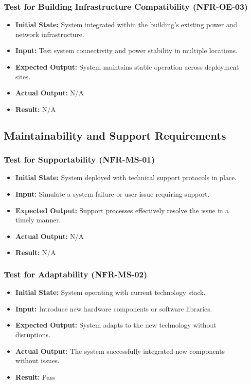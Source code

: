 \documentclass[12pt, titlepage]{article}
\begin{document}
\subsubsection{Test for Building Infrastructure Compatibility (NFR-OE-03)}
\begin{itemize}
    \item \textbf{Initial State: }System integrated within the building's existing power and network infrastructure.
    \item \textbf{Input: }Test system connectivity and power stability in multiple locations.
    \item \textbf{Expected Output: }System maintains stable operation across deployment sites.
    \item \textbf{Actual Output: } N/A
    \item \textbf{Result: }N/A
\end{itemize}

\subsection{Maintainability and Support Requirements}

\subsubsection{Test for Supportability (NFR-MS-01)}
\begin{itemize}
    \item \textbf{Initial State: }System deployed with technical support protocols in place.
    \item \textbf{Input: }Simulate a system failure or user issue requiring support.
    \item \textbf{Expected Output: }Support processes effectively resolve the issue in a timely manner.
    \item \textbf{Actual Output: }N/A
    \item \textbf{Result: }N/A
\end{itemize}

\subsubsection{Test for Adaptability (NFR-MS-02)}
\begin{itemize}
    \item \textbf{Initial State: }System operating with current technology stack.
    \item \textbf{Input: }Introduce new hardware components or software libraries.
    \item \textbf{Expected Output: }System adapts to the new technology without disruptions.
    \item \textbf{Actual Output: }The system successfully integrated new components without issues.
    \item \textbf{Result: }Pass
\end{itemize}
\end{document}
